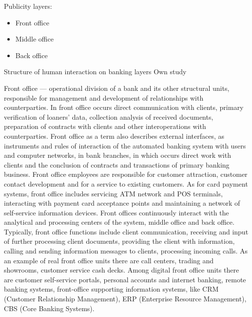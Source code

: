 Publicity layers:
\begin{itemize}
    \item Front office
    \item Middle office
    \item Back office
\end{itemize}

\mttable
{Structure of human interaction on banking layers}
{Own study}
{
}

Front office — operational division of a bank and its other structural units, responsible for management and development of relationships with counterparties.
In front office occurs direct communication with clients, primary verification of loaners' data, collection analysis of received documents, preparation of contracts with clients and other interoperations with counterparties.
Front office as a term also describes external interfaces, as instruments and rules of interaction of the automated banking system with users and computer networks, in bank branches, in which occurs direct work with clients and the conclusion of contracts and transactions of primary banking business.
Front office employees are responsible for customer attraction, customer contact development and for a service to existing customers. 
As for card payment systems, front office includes servicing ATM network and POS terminals, interacting with payment card acceptance points and maintaining a network of self-service information devices.
Front offices continuously interact with the analytical and processing centers of the system, middle office and back office.
Typically, front office functions include client communication, receiving and input of further processing client documents, providing the client with information, calling and sending information messages to clients, processing incoming calls.
As an example of real front office units there are call centers, trading and showrooms, customer service cash decks.
Among digital front office units there are customer self-service portals, personal accounts and internet banking, remote banking systems, front-office supporting information systems, like CRM (Customer Relationship Management), ERP (Enterprise Resource Management), CBS (Core Banking Systems).

